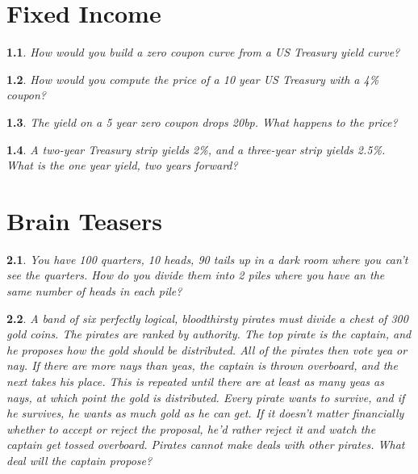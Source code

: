 \documentclass{report}
\newtheorem{problem}{}
\numberwithin{problem}{chapter} %
\begin{document}
\chapter{Fixed Income}

\begin{problem}
How would you build a zero coupon curve from a US Treasury yield curve?
\end{problem}

\begin{problem}
How would you compute the price of a 10 year US Treasury with a 4\% coupon?
\end{problem}

\begin{problem}
The yield on a 5 year zero coupon drops 20bp. What happens to the price?
\end{problem}

\begin{problem}
A two-year Treasury strip yields 2\%, and a three-year strip yields 2.5\%. What is the one year yield, two years forward? 
\end{problem}


\chapter{Brain Teasers}

\begin{problem}
You have 100 quarters, 10 heads, 90 tails up in a dark room where you can't see the quarters. How do you divide them into 2 piles where you have an the same number of heads in each pile?
\end{problem}

\begin{problem}
A band of six perfectly logical, bloodthirsty pirates must divide a chest of 300 gold coins. The pirates are ranked by authority. The top pirate is the captain, and he proposes how the gold should be distributed. All of the pirates then vote yea or nay. If there are more nays than yeas, the captain is thrown overboard, and the next takes his place. This is repeated until there are at least as many yeas as nays, at which point the gold is distributed. Every pirate wants to survive, and if he survives, he wants as much gold as he can get. If it doesn't matter financially whether to accept or reject the proposal, he'd rather reject it and watch the captain get tossed overboard. Pirates cannot make deals with other pirates. What deal will the captain propose?
\end{problem}
\end{document}
